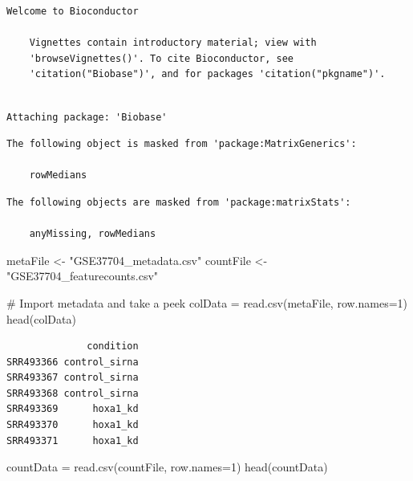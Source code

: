 \documentclass[
  letterpaper,
  DIV=11,
  numbers=noendperiod]{scrartcl}
\newenvironment{Shaded}{\begin{snugshade}}{\end{snugshade}}
\newcommand{\AttributeTok}[1]{\textcolor[rgb]{0.40,0.45,0.13}{#1}}
\newcommand{\CommentTok}[1]{\textcolor[rgb]{0.37,0.37,0.37}{#1}}
\newcommand{\DecValTok}[1]{\textcolor[rgb]{0.68,0.00,0.00}{#1}}
\newcommand{\FunctionTok}[1]{\textcolor[rgb]{0.28,0.35,0.67}{#1}}
\newcommand{\NormalTok}[1]{\textcolor[rgb]{0.00,0.23,0.31}{#1}}
\newcommand{\OtherTok}[1]{\textcolor[rgb]{0.00,0.23,0.31}{#1}}
\newcommand{\StringTok}[1]{\textcolor[rgb]{0.13,0.47,0.30}{#1}}
\begin{document}
\begin{verbatim}
Welcome to Bioconductor

    Vignettes contain introductory material; view with
    'browseVignettes()'. To cite Bioconductor, see
    'citation("Biobase")', and for packages 'citation("pkgname")'.
\end{verbatim}

\begin{verbatim}

Attaching package: 'Biobase'
\end{verbatim}

\begin{verbatim}
The following object is masked from 'package:MatrixGenerics':

    rowMedians
\end{verbatim}

\begin{verbatim}
The following objects are masked from 'package:matrixStats':

    anyMissing, rowMedians
\end{verbatim}

\begin{Shaded}
\begin{Highlighting}[]
\NormalTok{metaFile }\OtherTok{\textless{}{-}} \StringTok{"GSE37704\_metadata.csv"}
\NormalTok{countFile }\OtherTok{\textless{}{-}} \StringTok{"GSE37704\_featurecounts.csv"}

\CommentTok{\# Import metadata and take a peek}
\NormalTok{colData }\OtherTok{=} \FunctionTok{read.csv}\NormalTok{(metaFile, }\AttributeTok{row.names=}\DecValTok{1}\NormalTok{)}
\FunctionTok{head}\NormalTok{(colData)}
\end{Highlighting}
\end{Shaded}

\begin{verbatim}
              condition
SRR493366 control_sirna
SRR493367 control_sirna
SRR493368 control_sirna
SRR493369      hoxa1_kd
SRR493370      hoxa1_kd
SRR493371      hoxa1_kd
\end{verbatim}

\begin{Shaded}
\begin{Highlighting}[]
\NormalTok{countData }\OtherTok{=} \FunctionTok{read.csv}\NormalTok{(countFile, }\AttributeTok{row.names=}\DecValTok{1}\NormalTok{)}
\FunctionTok{head}\NormalTok{(countData)}
\end{Highlighting}
\end{Shaded}
\end{document}
